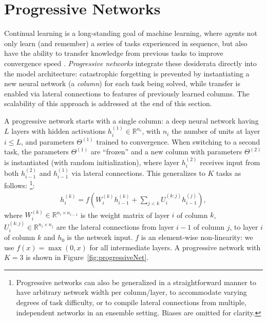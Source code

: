 \section{Progressive Networks}

Continual learning is a long-standing goal of machine learning, where agents
not only learn (and remember) a series of tasks experienced in sequence, but also have
the ability to transfer knowledge from previous tasks to improve convergence speed \cite{AAAIMag11-Taylor}.
\textit{Progressive networks} integrate these desiderata directly into the
model architecture: catastrophic forgetting is prevented by instantiating a new
neural network (a \textit{column}) for each task being solved, while transfer is
enabled via lateral connections to features of previously learned columns. The
scalability of this approach is addressed at the end of this section.

A progressive network starts with a single column: a deep neural network having
$L$ layers with hidden activations $h_i^{(1)} \in \mathbb{R}^{n_i}$,
with $n_i$ the number of units at layer $i \le L$, and parameters
$\Theta^{(1)}$ trained to convergence.  When switching to a second task, the
parameters $\Theta^{(1)}$ are ``frozen'' and a new
column with parameters $\Theta^{(2)}$ is instantiated (with random
initialization), where layer $h_i^{(2)}$ receives input from both
$h_{i-1}^{(2)}$ and $h_{i-1}^{(1)}$ via lateral connections. This
generalizes to $K$ tasks as follows:
\footnote{Progressive networks can also be generalized in a straightforward
manner to have arbitrary network width per column/layer, to accommodate varying
degrees of task difficulty, or to compile lateral connections from multiple,
independent networks in an ensemble setting. Biases are omitted for clarity.}:
\begin{align}
  \label{eq:prognet}
  h_i^{(k)} = f\left( W_i^{(k)} h_{i-1}^{(k)} + \sum_{j<k} U_{i}^{(k:j)} h_{i-1}^{(j)} \right),
\end{align}
where $W_i^{(k)} \in \mathbb{R}^{n_{i} \times n_{i-1}}$ is the weight matrix of layer
$i$ of column $k$, $U_{i}^{(k:j)} \in \mathbb{R}^{n_i \times n_j}$ are the
lateral connections from layer $i-1$ of column $j$, to layer $i$ of column $k$
and $h_0$ is the network input.
$f$ is an element-wise non-linearity: we use $f(x)=\max(0, x)$ for all
intermediate layers.
A progressive network with $K=3$ is shown in Figure~\ref{fig:progressiveNet}.

